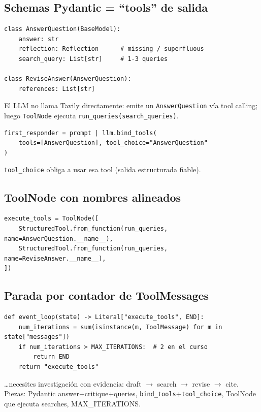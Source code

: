 \documentclass[11pt,a4paper]{article}
\begin{document}
\subsection{Schemas Pydantic = ``tools'' de salida}
\begin{lstlisting}
class AnswerQuestion(BaseModel):
    answer: str
    reflection: Reflection      # missing / superfluous
    search_query: List[str]     # 1-3 queries

class ReviseAnswer(AnswerQuestion):
    references: List[str]
\end{lstlisting}

El LLM no llama Tavily directamente: emite un \texttt{AnswerQuestion} vía tool calling;
luego \texttt{ToolNode} ejecuta \texttt{run\_queries(search\_queries)}.

\begin{howto}[title=Forzar el schema]
\begin{lstlisting}
first_responder = prompt | llm.bind_tools(
    tools=[AnswerQuestion], tool_choice="AnswerQuestion"
)
\end{lstlisting}
\texttt{tool\_choice} obliga a usar esa tool (salida estructurada fiable).
\end{howto}

\subsection{ToolNode con nombres alineados}
\begin{lstlisting}
execute_tools = ToolNode([
    StructuredTool.from_function(run_queries, name=AnswerQuestion.__name__),
    StructuredTool.from_function(run_queries, name=ReviseAnswer.__name__),
])
\end{lstlisting}

\subsection{Parada por contador de ToolMessages}
\begin{lstlisting}
def event_loop(state) -> Literal["execute_tools", END]:
    num_iterations = sum(isinstance(m, ToolMessage) for m in state["messages"])
    if num_iterations > MAX_ITERATIONS:  # 2 en el curso
        return END
    return "execute_tools"
\end{lstlisting}

\begin{howto}[title=Reutiliza Reflexion cuando\ldots]
\ldots{}necesites investigación con evidencia: draft $\to$ search $\to$ revise $\to$ cite.
Piezas: Pydantic answer+critique+queries, \texttt{bind\_tools}+\texttt{tool\_choice}, ToolNode que ejecuta searches, MAX\_ITERATIONS.
\end{howto}
\end{document}
